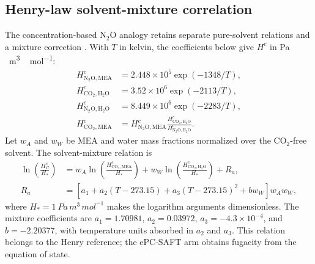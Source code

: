 \subsection{Henry-law solvent-mixture correlation}\label{app:henry}
The concentration-based N$_2$O analogy retains separate pure-solvent relations and a mixture correction \cite{Jiru2012}.
With $T$ in kelvin, the coefficients below give $H^c$ in \unit{Pa\,m^3\,mol^{-1}}:
\begin{align}
H_{\mathrm{N_2O,MEA}}^c&=2.448\times10^5\exp(-1348/T),\\
H_{\mathrm{CO_2,H_2O}}^c&=3.52\times10^6\exp(-2113/T),\\
H_{\mathrm{N_2O,H_2O}}^c&=8.449\times10^6\exp(-2283/T),\\
H_{\mathrm{CO_2,MEA}}^c&=H_{\mathrm{N_2O,MEA}}^c
\frac{H_{\mathrm{CO_2,H_2O}}^c}{H_{\mathrm{N_2O,H_2O}}^c}.
\end{align}
Let $w_A$ and $w_W$ be MEA and water mass fractions normalized over the CO$_2$-free solvent.
The solvent-mixture relation is
\begin{align}
\ln\left(\frac{H_C^c}{H_*}\right)
&=w_A\ln\left(\frac{H_{\mathrm{CO_2,MEA}}^c}{H_*}\right)
+w_W\ln\left(\frac{H_{\mathrm{CO_2,H_2O}}^c}{H_*}\right)+R_a,\\
R_a&=\left[a_1+a_2(T-273.15)+a_3(T-273.15)^2+bw_W\right]w_Aw_W,
\end{align}
where $H_*=\qty{1}{Pa\,m^3\,mol^{-1}}$ makes the logarithm arguments dimensionless.
The mixture coefficients are $a_1=1.70981$, $a_2=0.03972$, $a_3=-4.3\times10^{-4}$, and $b=-2.20377$, with temperature units absorbed in $a_2$ and $a_3$.
This relation belongs to the Henry reference; the ePC-SAFT arm obtains fugacity from the equation of state.

